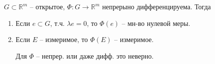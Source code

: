 \begin{theorem}
    $G \subset \mathbb{R}^m$ -- открытое, $\Phi: G \rightarrow \mathbb{R}^m$ непрерыно дифференцируема. Тогда

    \begin{enumerate}
        \item {
            Если $e \subset G$, т.ч. $\lambda e = 0$, то $\Phi(e)$ -- мн-во нулевой меры.
        }
        \item {
            Если  $E$ -- измеримое, то $\Phi(E)$ -- измеримое.

            \begin{remark}
                Для $\Phi$ -- непрер. или даже дифф. это неверно.
            \end{remark}
        }
    \end{enumerate}
\end{theorem}
